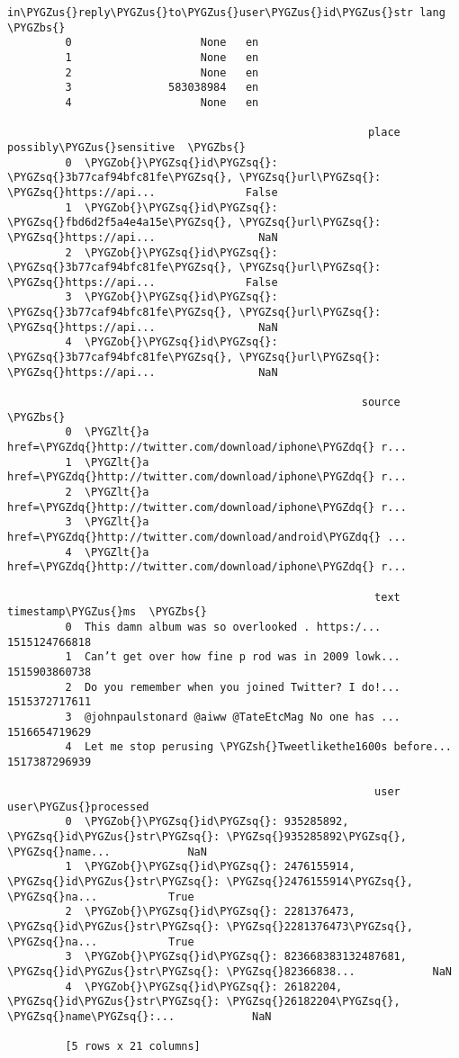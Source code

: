 \documentclass[letterpaper,10pt,english]{sphinxmanual}
\begin{document}
\begin{Verbatim}[commandchars=\\\{\}]
           in\PYGZus{}reply\PYGZus{}to\PYGZus{}user\PYGZus{}id\PYGZus{}str lang  \PYGZbs{}
         0                    None   en
         1                    None   en
         2                    None   en
         3               583038984   en
         4                    None   en
         
                                                        place possibly\PYGZus{}sensitive  \PYGZbs{}
         0  \PYGZob{}\PYGZsq{}id\PYGZsq{}: \PYGZsq{}3b77caf94bfc81fe\PYGZsq{}, \PYGZsq{}url\PYGZsq{}: \PYGZsq{}https://api...              False
         1  \PYGZob{}\PYGZsq{}id\PYGZsq{}: \PYGZsq{}fbd6d2f5a4e4a15e\PYGZsq{}, \PYGZsq{}url\PYGZsq{}: \PYGZsq{}https://api...                NaN
         2  \PYGZob{}\PYGZsq{}id\PYGZsq{}: \PYGZsq{}3b77caf94bfc81fe\PYGZsq{}, \PYGZsq{}url\PYGZsq{}: \PYGZsq{}https://api...              False
         3  \PYGZob{}\PYGZsq{}id\PYGZsq{}: \PYGZsq{}3b77caf94bfc81fe\PYGZsq{}, \PYGZsq{}url\PYGZsq{}: \PYGZsq{}https://api...                NaN
         4  \PYGZob{}\PYGZsq{}id\PYGZsq{}: \PYGZsq{}3b77caf94bfc81fe\PYGZsq{}, \PYGZsq{}url\PYGZsq{}: \PYGZsq{}https://api...                NaN
         
                                                       source  \PYGZbs{}
         0  \PYGZlt{}a href=\PYGZdq{}http://twitter.com/download/iphone\PYGZdq{} r...
         1  \PYGZlt{}a href=\PYGZdq{}http://twitter.com/download/iphone\PYGZdq{} r...
         2  \PYGZlt{}a href=\PYGZdq{}http://twitter.com/download/iphone\PYGZdq{} r...
         3  \PYGZlt{}a href=\PYGZdq{}http://twitter.com/download/android\PYGZdq{} ...
         4  \PYGZlt{}a href=\PYGZdq{}http://twitter.com/download/iphone\PYGZdq{} r...
         
                                                         text   timestamp\PYGZus{}ms  \PYGZbs{}
         0  This damn album was so overlooked . https:/...  1515124766818
         1  Can’t get over how fine p rod was in 2009 lowk...  1515903860738
         2  Do you remember when you joined Twitter? I do!...  1515372717611
         3  @johnpaulstonard @aiww @TateEtcMag No one has ...  1516654719629
         4  Let me stop perusing \PYGZsh{}Tweetlikethe1600s before...  1517387296939
         
                                                         user user\PYGZus{}processed
         0  \PYGZob{}\PYGZsq{}id\PYGZsq{}: 935285892, \PYGZsq{}id\PYGZus{}str\PYGZsq{}: \PYGZsq{}935285892\PYGZsq{}, \PYGZsq{}name...            NaN
         1  \PYGZob{}\PYGZsq{}id\PYGZsq{}: 2476155914, \PYGZsq{}id\PYGZus{}str\PYGZsq{}: \PYGZsq{}2476155914\PYGZsq{}, \PYGZsq{}na...           True
         2  \PYGZob{}\PYGZsq{}id\PYGZsq{}: 2281376473, \PYGZsq{}id\PYGZus{}str\PYGZsq{}: \PYGZsq{}2281376473\PYGZsq{}, \PYGZsq{}na...           True
         3  \PYGZob{}\PYGZsq{}id\PYGZsq{}: 823668383132487681, \PYGZsq{}id\PYGZus{}str\PYGZsq{}: \PYGZsq{}82366838...            NaN
         4  \PYGZob{}\PYGZsq{}id\PYGZsq{}: 26182204, \PYGZsq{}id\PYGZus{}str\PYGZsq{}: \PYGZsq{}26182204\PYGZsq{}, \PYGZsq{}name\PYGZsq{}:...            NaN
         
         [5 rows x 21 columns]
\end{Verbatim}
\end{document}
